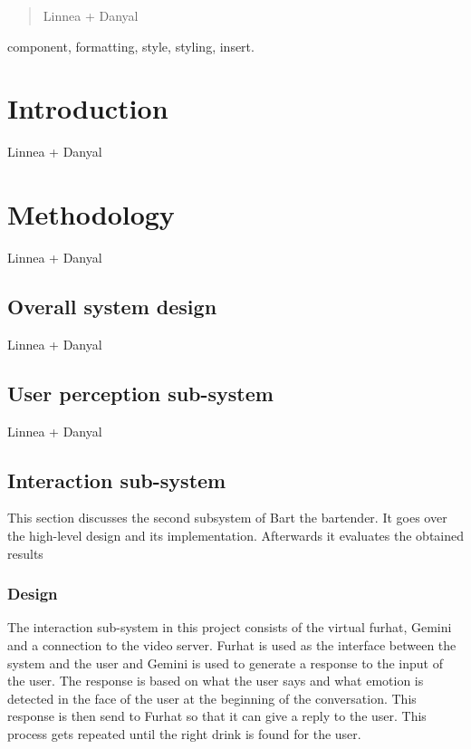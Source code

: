 \documentclass[conference]{IEEEtran}
\begin{document}
\begin{abstract}
Linnea + Danyal
\end{abstract}

\begin{IEEEkeywords}
component, formatting, style, styling, insert.
\end{IEEEkeywords}

\section{Introduction}
Linnea + Danyal

\section{Methodology}
Linnea + Danyal

\subsection{Overall system design}
Linnea + Danyal

\subsection{User perception sub-system}
Linnea + Danyal

\subsection{Interaction sub-system} %
This section discusses the second subsystem of Bart the bartender. 
It goes over the high-level design and its implementation. 
Afterwards it evaluates the obtained results

\subsubsection{Design}
The interaction sub-system in this project consists of the virtual furhat, Gemini and a connection to the video server.
Furhat is used as the interface between the system and the user and Gemini is used to generate a response to the input of the user.
The response is based on what the user says and what emotion is detected in the face of the user at the beginning of the conversation.
This response is then send to Furhat so that it can give a reply to the user.
This process gets repeated until the right drink is found for the user.
\end{document}
